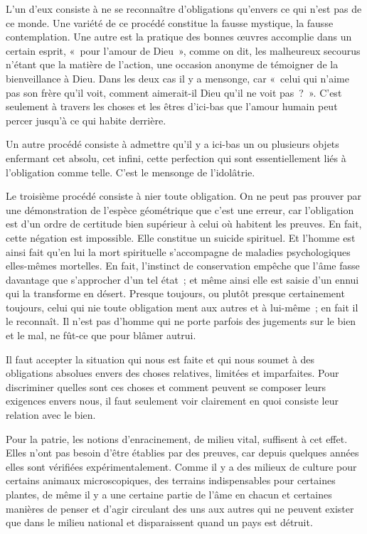 \documentclass[french,twoside]{book} %
\begin{document}
L'un d'eux consiste à ne se reconnaître d'obligations qu'envers ce qui n'est pas de ce monde. Une variété de ce procédé constitue la fausse mystique, la fausse contemplation. Une autre est la pratique des bonnes œuvres accomplie dans un certain esprit, « pour l'amour de Dieu », comme on dit, les malheureux secourus n'étant que la matière de l'action, une occasion anonyme de témoigner de la bienveillance à Dieu. Dans les deux cas il y a mensonge, car « celui qui n'aime pas son frère qu'il voit, comment aimerait-il Dieu qu'il ne voit pas ? ». C'est seulement à travers les choses et les êtres d'ici-bas que l'amour humain peut percer jusqu'à ce qui habite derrière.\par
Un autre procédé consiste à admettre qu'il y a ici-bas un ou plusieurs objets enfermant cet absolu, cet infini, cette perfection qui sont essentiellement liés à l'obligation comme telle. C'est le mensonge de l'idolâtrie.\par
Le troisième procédé consiste à nier toute obligation. On ne peut pas prouver par une démonstration de l’espèce géométrique que c'est une erreur, car l'obligation est d'un ordre de certitude bien supérieur à celui où habitent les preuves. En fait, cette négation est impossible. Elle constitue un suicide spirituel. Et l'homme est ainsi fait qu'en lui la mort spirituelle s'accompagne de maladies psychologiques elles-mêmes mortelles. En fait, l'instinct de conservation empêche que l'âme fasse davantage que s'approcher d'un tel état ; et même ainsi elle est saisie d'un ennui qui la transforme en désert. Presque toujours, ou plutôt presque certainement toujours, celui qui nie toute obligation ment aux autres et à lui-même ; en fait il le reconnaît. Il n'est pas d'homme qui ne porte parfois des jugements sur le bien et le mal, ne fût-ce que pour blâmer autrui.\par
Il faut accepter la situation qui nous est faite et qui nous soumet à des obligations absolues envers des choses relatives, limitées et imparfaites. Pour discriminer quelles sont ces choses et comment peuvent se composer leurs exigences envers nous, il faut seulement voir clairement en quoi consiste leur relation avec le bien.\par
Pour la patrie, les notions d'enracinement, de milieu vital, suffisent à cet effet. Elles n'ont pas besoin d'être établies par des preuves, car depuis quelques années elles sont vérifiées expérimentalement. Comme il y a des milieux de culture pour certains animaux microscopiques, des terrains indispensables pour certaines plantes, de même il y a une certaine partie de l'âme en chacun et certaines manières de penser et d'agir circulant des uns aux autres qui ne peuvent exister que dans le milieu national et disparaissent quand un pays est détruit.\par
\end{document}
